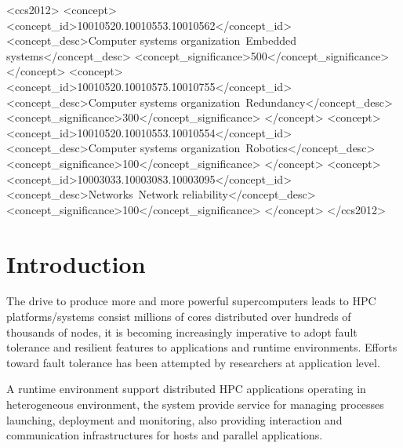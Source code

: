 \documentclass[sigconf]{acmart}
\begin{document}
%
%
\begin{CCSXML}
<ccs2012>
 <concept>
  <concept_id>10010520.10010553.10010562</concept_id>
  <concept_desc>Computer systems organization~Embedded systems</concept_desc>
  <concept_significance>500</concept_significance>
 </concept>
 <concept>
  <concept_id>10010520.10010575.10010755</concept_id>
  <concept_desc>Computer systems organization~Redundancy</concept_desc>
  <concept_significance>300</concept_significance>
 </concept>
 <concept>
  <concept_id>10010520.10010553.10010554</concept_id>
  <concept_desc>Computer systems organization~Robotics</concept_desc>
  <concept_significance>100</concept_significance>
 </concept>
 <concept>
  <concept_id>10003033.10003083.10003095</concept_id>
  <concept_desc>Networks~Network reliability</concept_desc>
  <concept_significance>100</concept_significance>
 </concept>
</ccs2012>
\end{CCSXML}


%

%
\maketitle

\section{Introduction}
The drive to produce more and more powerful supercomputers leads to HPC platforms/systems consist millions of cores distributed over hundreds of thousands of nodes, it is becoming increasingly imperative to adopt fault tolerance and resilient features to applications and runtime environments. Efforts toward fault tolerance has been attempted by researchers at application level. 

A runtime environment support distributed HPC applications operating in heterogeneous environment, the system provide service for managing processes launching, deployment and monitoring, also providing interaction and communication infrastructures for hosts and parallel applications. 
\end{document}
